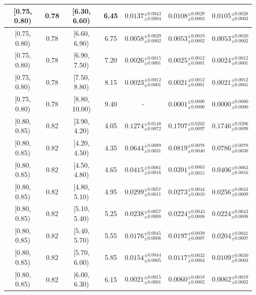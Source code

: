 \begin{longtable}{|c|c|c|c|c|c|c|}
\hline
[0.75, 0.80) & 0.78 & [6.30, 6.60) & 6.45 & $0.0137^{ \pm 0.0043 }_{ \pm 0.0004 }$ & $0.0108^{ \pm 0.0029 }_{ \pm 0.0003 }$ & $0.0105^{ \pm 0.0028 }_{ \pm 0.0003 }$ \\ 
\hline
[0.75, 0.80) & 0.78 & [6.60, 6.90) & 6.75 & $0.0058^{ \pm 0.0029 }_{ \pm 0.0002 }$ & $0.0053^{ \pm 0.0019 }_{ \pm 0.0002 }$ & $0.0053^{ \pm 0.0020 }_{ \pm 0.0002 }$ \\ 
\hline
[0.75, 0.80) & 0.78 & [6.90, 7.50) & 7.20 & $0.0026^{ \pm 0.0015 }_{ \pm 0.0001 }$ & $0.0025^{ \pm 0.0012 }_{ \pm 0.0001 }$ & $0.0024^{ \pm 0.0012 }_{ \pm 0.0001 }$ \\ 
\hline
[0.75, 0.80) & 0.78 & [7.50, 8.80) & 8.15 & $0.0023^{ \pm 0.0012 }_{ \pm 0.0001 }$ & $0.0021^{ \pm 0.0012 }_{ \pm 0.0001 }$ & $0.0021^{ \pm 0.0012 }_{ \pm 0.0001 }$ \\ 
\hline
[0.75, 0.80) & 0.78 & [8.80, 10.00) & 9.40 & - & $0.0001^{ \pm 0.0000 }_{ \pm 0.0000 }$ & $0.0000^{ \pm 0.0000 }_{ \pm 0.0000 }$ \\ 
\hline
[0.80, 0.85) & 0.82 & [3.90, 4.20) & 4.05 & $0.1274^{ \pm 0.0148 }_{ \pm 0.0072 }$ & $0.1707^{ \pm 0.0202 }_{ \pm 0.0097 }$ & $0.1746^{ \pm 0.0206 }_{ \pm 0.0099 }$ \\ 
\hline
[0.80, 0.85) & 0.82 & [4.20, 4.50) & 4.35 & $0.0644^{ \pm 0.0089 }_{ \pm 0.0031 }$ & $0.0819^{ \pm 0.0078 }_{ \pm 0.0040 }$ & $0.0786^{ \pm 0.0078 }_{ \pm 0.0038 }$ \\ 
\hline
[0.80, 0.85) & 0.82 & [4.50, 4.80) & 4.65 & $0.0415^{ \pm 0.0081 }_{ \pm 0.0016 }$ & $0.0391^{ \pm 0.0063 }_{ \pm 0.0015 }$ & $0.0406^{ \pm 0.0063 }_{ \pm 0.0016 }$ \\ 
\hline
[0.80, 0.85) & 0.82 & [4.80, 5.10) & 4.95 & $0.0299^{ \pm 0.0057 }_{ \pm 0.0011 }$ & $0.0273^{ \pm 0.0044 }_{ \pm 0.0010 }$ & $0.0256^{ \pm 0.0043 }_{ \pm 0.0009 }$ \\ 
\hline
[0.80, 0.85) & 0.82 & [5.10, 5.40) & 5.25 & $0.0238^{ \pm 0.0057 }_{ \pm 0.0008 }$ & $0.0224^{ \pm 0.0043 }_{ \pm 0.0008 }$ & $0.0224^{ \pm 0.0043 }_{ \pm 0.0008 }$ \\ 
\hline
[0.80, 0.85) & 0.82 & [5.40, 5.70) & 5.55 & $0.0176^{ \pm 0.0045 }_{ \pm 0.0006 }$ & $0.0197^{ \pm 0.0039 }_{ \pm 0.0007 }$ & $0.0204^{ \pm 0.0041 }_{ \pm 0.0007 }$ \\ 
\hline
[0.80, 0.85) & 0.82 & [5.70, 6.00) & 5.85 & $0.0154^{ \pm 0.0044 }_{ \pm 0.0005 }$ & $0.0117^{ \pm 0.0032 }_{ \pm 0.0004 }$ & $0.0109^{ \pm 0.0030 }_{ \pm 0.0003 }$ \\ 
\hline
[0.80, 0.85) & 0.82 & [6.00, 6.30) & 6.15 & $0.0021^{ \pm 0.0015 }_{ \pm 0.0001 }$ & $0.0060^{ \pm 0.0018 }_{ \pm 0.0002 }$ & $0.0062^{ \pm 0.0019 }_{ \pm 0.0002 }$ \\ 

\end{longtable}
